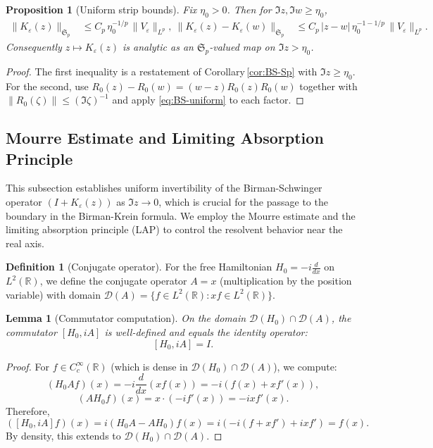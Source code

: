 ﻿\documentclass[12pt,a4paper]{article}
\newtheorem{lemma}[theorem]{Lemma}
\newtheorem{proposition}[theorem]{Proposition}
\theoremstyle{definition}
\newtheorem{definition}[theorem]{Definition}
\theoremstyle{remark}
\newcommand{\RR}{\mathbb{R}}
\begin{document}
\begin{proposition}[Uniform strip bounds]\label{prop:BS-uniform}
Fix $\eta_0>0$. Then for $\Im z,\Im w\ge \eta_0$,
\begin{align}
  \|K_\varepsilon(z)\|_{\mathfrak S_p} &\le C_p\,\eta_0^{-1/p}\,\|V_\varepsilon\|_{L^p},\label{eq:BS-uniform}\
  \|K_\varepsilon(z)-K_\varepsilon(w)\|_{\mathfrak S_p} &\le C_p\,|z-w|\,\eta_0^{-1-1/p}\,\|V_\varepsilon\|_{L^p}.
\end{align}
Consequently $z\mapsto K_\varepsilon(z)$ is analytic as an $\mathfrak S_p$-valued map on $\Im z>\eta_0$.
\end{proposition}

\begin{proof}
The first inequality is a restatement of Corollary\,\ref{cor:BS-Sp} with $\Im z\ge \eta_0$.  For the second, use $R_0(z)-R_0(w)=(w-z)R_0(z)R_0(w)$ together with $\|R_0(\zeta)\|\le (\Im\zeta)^{-1}$ and apply \eqref{eq:BS-uniform} to each factor.
\end{proof}

\subsection{Mourre Estimate and Limiting Absorption Principle}
\label{subsec:mourre-lap}

This subsection establishes uniform invertibility of the Birman-Schwinger operator $(I + K_\varepsilon(z))$ as $\Im z \to 0$, which is crucial for the passage to the boundary in the Birman-Krein formula. We employ the Mourre estimate and the limiting absorption principle (LAP) to control the resolvent behavior near the real axis.

\begin{definition}[Conjugate operator]
\label{def:conjugate-operator}
For the free Hamiltonian $H_0 = -i\frac{d}{dx}$ on $L^2(\RR)$, we define the conjugate operator $A = x$ (multiplication by the position variable) with domain $\mathcal{D}(A) = \{f \in L^2(\RR) : xf \in L^2(\RR)\}$.
\end{definition}

\begin{lemma}[Commutator computation]
\label{lem:commutator-H0-A}
On the domain $\mathcal{D}(H_0) \cap \mathcal{D}(A)$, the commutator $[H_0, iA]$ is well-defined and equals the identity operator:
\[
  [H_0, iA] = I.
\]
\end{lemma}

\begin{proof}
For $f \in C_c^\infty(\RR)$ (which is dense in $\mathcal{D}(H_0) \cap \mathcal{D}(A)$), we compute:
\[
  (H_0 A f)(x) = -i\frac{d}{dx}(xf(x)) = -i(f(x) + xf'(x)),
\]
\[
  (A H_0 f)(x) = x \cdot (-if'(x)) = -ixf'(x).
\]
Therefore,
\[
  ([H_0, iA]f)(x) = i(H_0 A - A H_0)f(x) = i(-i(f + xf') + ixf') = f(x).
\]
By density, this extends to $\mathcal{D}(H_0) \cap \mathcal{D}(A)$.
\end{proof}
\end{document}
